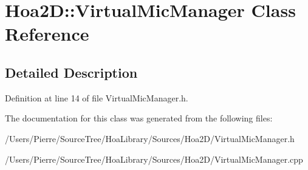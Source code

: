 \hypertarget{class_hoa2_d_1_1_virtual_mic_manager}{\section{Hoa2\-D\-:\-:Virtual\-Mic\-Manager Class Reference}
\label{class_hoa2_d_1_1_virtual_mic_manager}
}


\subsection{Detailed Description}


Definition at line 14 of file Virtual\-Mic\-Manager.\-h.



The documentation for this class was generated from the following files\-:\begin{DoxyCompactItemize}
\item 
/\-Users/\-Pierre/\-Source\-Tree/\-Hoa\-Library/\-Sources/\-Hoa2\-D/Virtual\-Mic\-Manager.\-h\item 
/\-Users/\-Pierre/\-Source\-Tree/\-Hoa\-Library/\-Sources/\-Hoa2\-D/Virtual\-Mic\-Manager.\-cpp\end{DoxyCompactItemize}
